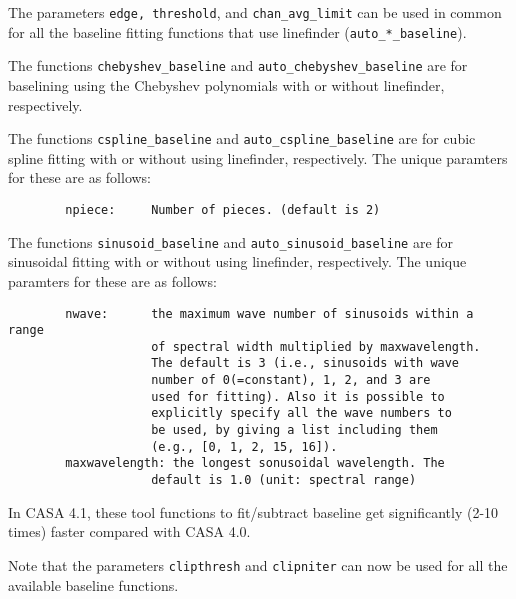 The parameters {\tt edge, threshold}, and {\tt chan\_avg\_limit} can be used 
in common for all the baseline fitting functions that use linefinder 
({\tt auto\_*\_baseline}). 

The functions {\tt chebyshev\_baseline} and {\tt auto\_chebyshev\_baseline} 
are for baselining using the Chebyshev polynomials with or without linefinder, 
respectively. 

The functions {\tt cspline\_baseline} and {\tt auto\_cspline\_baseline} 
are for cubic spline fitting with or without using linefinder, respectively. 
The unique paramters for these are as follows:

\small
\begin{verbatim}
        npiece:     Number of pieces. (default is 2)
\end{verbatim}
\normalsize

The functions {\tt sinusoid\_baseline} and {\tt auto\_sinusoid\_baseline} 
are for sinusoidal fitting with or without using linefinder, respectively. 
The unique paramters for these are as follows:

\small
\begin{verbatim}
        nwave:      the maximum wave number of sinusoids within a range 
                    of spectral width multiplied by maxwavelength.
                    The default is 3 (i.e., sinusoids with wave 
                    number of 0(=constant), 1, 2, and 3 are 
                    used for fitting). Also it is possible to 
                    explicitly specify all the wave numbers to 
                    be used, by giving a list including them 
                    (e.g., [0, 1, 2, 15, 16]).
        maxwavelength: the longest sonusoidal wavelength. The 
                    default is 1.0 (unit: spectral range)
\end{verbatim}
\normalsize

In CASA 4.1, these tool functions to fit/subtract baseline get 
significantly (2-10 times) faster compared with CASA 4.0.

Note that the parameters {\tt clipthresh} and {\tt clipniter} can now be 
used for all the available baseline functions. 

